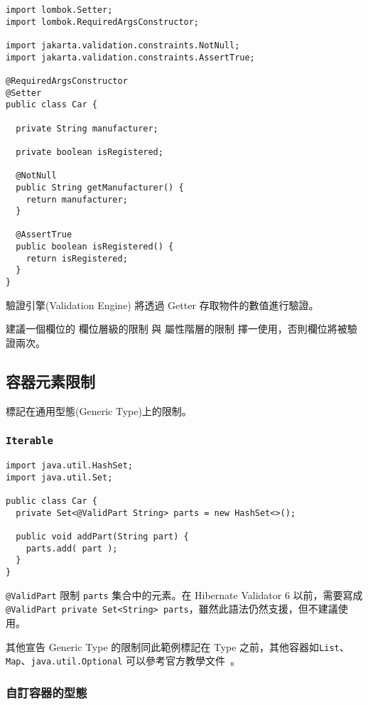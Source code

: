 \begin{lstlisting}
import lombok.Setter;
import lombok.RequiredArgsConstructor;

import jakarta.validation.constraints.NotNull;
import jakarta.validation.constraints.AssertTrue;

@RequiredArgsConstructor
@Setter
public class Car {

  private String manufacturer;

  private boolean isRegistered;

  @NotNull
  public String getManufacturer() {
    return manufacturer;
  }

  @AssertTrue
  public boolean isRegistered() {
    return isRegistered;
  }
}
\end{lstlisting}

驗證引擎(Validation Engine) 將透過 Getter 存取物件的數值進行驗證。

建議一個欄位的 欄位層級的限制 與 屬性階層的限制 擇一使用，否則欄位將被驗證兩次。

\subsection{容器元素限制}

標記在通用型態(Generic Type)上的限制。

\subsubsection{\texttt{Iterable}}

\begin{lstlisting}
import java.util.HashSet;
import java.util.Set;

public class Car {
  private Set<@ValidPart String> parts = new HashSet<>();

  public void addPart(String part) {
    parts.add( part );
  }
}
\end{lstlisting}

\texttt{@ValidPart} 限制 \texttt{parts} 集合中的元素。在 Hibernate Validator 6 以前，需要寫成 \texttt{@ValidPart private Set<String> parts}，雖然此語法仍然支援，但不建議使用。

其他宣告 Generic Type 的限制同此範例標記在 Type 之前，其他容器如\texttt{List}、\texttt{Map}、\texttt{java.util.Optional} 可以參考官方教學文件~\cite{hibernate-validator-doc}。

\subsubsection{自訂容器的型態}

